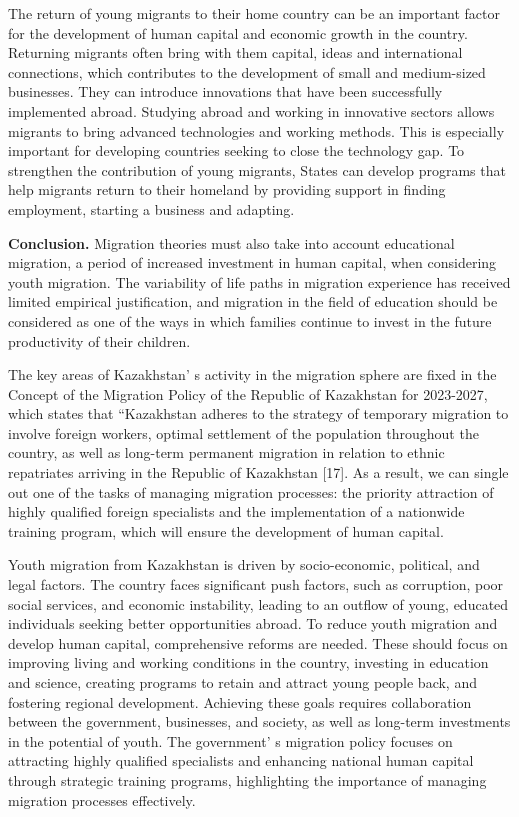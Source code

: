 \begin{multicols}{2}
The return of young migrants to their home country can be an important
factor for the development of human capital and economic growth in the
country. Returning migrants often bring with them capital, ideas and
international connections, which contributes to the development of small
and medium-sized businesses. They can introduce innovations that have
been successfully implemented abroad. Studying abroad and working in
innovative sectors allows migrants to bring advanced technologies and
working methods. This is especially important for developing countries
seeking to close the technology gap. To strengthen the contribution of
young migrants, States can develop programs that help migrants return to
their homeland by providing support in finding employment, starting a
business and adapting.

{\bfseries Conclusion.} Migration theories must also take into account
educational migration, a period of increased investment in human
capital, when considering youth migration. The variability of life paths
in migration experience has received limited empirical justification,
and migration in the field of education should be considered as one of
the ways in which families continue to invest in the future productivity
of their children.

The key areas of Kazakhstan' s activity in the migration
sphere are fixed in the Concept of the Migration Policy of the Republic
of Kazakhstan for 2023-2027, which states that ``Kazakhstan adheres to
the strategy of temporary migration to involve foreign workers, optimal
settlement of the population throughout the country, as well as
long-term permanent migration in relation to ethnic repatriates arriving
in the Republic of Kazakhstan {[}17{]}. As a result, we can single out
one of the tasks of managing migration processes: the priority
attraction of highly qualified foreign specialists and the
implementation of a nationwide training program, which will ensure the
development of human capital.

Youth migration from Kazakhstan is driven by socio-economic, political,
and legal factors. The country faces significant push factors, such as
corruption, poor social services, and economic instability, leading to
an outflow of young, educated individuals seeking better opportunities
abroad. To reduce youth migration and develop human capital,
comprehensive reforms are needed. These should focus on improving living
and working conditions in the country, investing in education and
science, creating programs to retain and attract young people back, and
fostering regional development. Achieving these goals requires
collaboration between the government, businesses, and society, as well
as long-term investments in the potential of youth. The
government' s migration policy focuses on attracting
highly qualified specialists and enhancing national human capital
through strategic training programs, highlighting the importance of
managing migration processes effectively.
\end{multicols}

